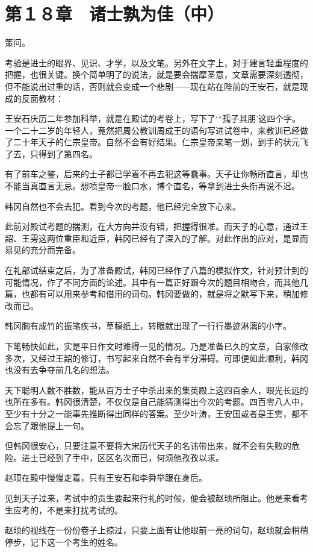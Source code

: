 \section{第１８章　诸士孰为佳（中）}

策问。

考验是进士的眼界、见识、才学，以及文笔。另外在文字上，对于建言轻重程度的把握，也很关键。换个简单明了的说法，就是要会揣摩圣意，文章需要深刻透彻，但不能说出过重的话，否则就会变成一个悲剧——现在站在陛前的王安石，就是现成的反面教材：

王安石庆历二年参加科举，就是在殿试的考卷上，写下了‘“孺子其朋’这四个字。一个二十二岁的年轻人，竟然把周公教训周成王的语句写进试卷中，来教训已经做了二十年天子的仁宗皇帝。自然不会有好结果。仁宗皇帝亲笔一划，到手的状元飞了去，只得到了第四名。

有了前车之鉴，后来的士子都已学着不再去犯这等蠢事。天子让你畅所直言，却也不能当真直言无忌。想喷皇帝一脸口水，博个直名，等拿到进士头衔再说不迟。

韩冈自然也不会去犯。看到今次的考题，他已经完全放下心来。

此前对殿试考题的揣测，在大方向并没有错，把握得很准。而天子的心意，通过王韶、王雱这两位重臣和近臣，韩冈已经有了深入的了解。对此作出的应对，是显而易见的充分而完备。

在礼部试结束之后，为了准备殿试，韩冈已经作了八篇的模拟作文，针对预计到的可能情况，作了不同方面的论述。其中有一篇正好跟今次的题目相吻合，而其他几篇，也都有可以用来参考和借用的词句。韩冈要做的，就是将之默写下来，稍加修改而已。

韩冈胸有成竹的振笔疾书，草稿纸上，转眼就出现了一行行墨迹淋漓的小字。

下笔畅快如此，实是平日作文时难得一见的情况。乃是准备已久的文章，自家修改多次，又经过王韶的修订，书写起来自然不会有半分滞碍。可即便如此顺利，韩冈也没有去争夺前几名的想法。

天下聪明人数不胜数，能从百万士子中杀出来的集英殿上这四百余人，眼光长远的也所在多有。韩冈很清楚，不仅仅是自己能猜测得出今次的考题。四百零八人中，至少有十分之一能事先推断得出同样的答案。至少叶涛，王安国或者是王雱，都不会忘了跟他提上一句。

但韩冈很安心，只要注意不要将大宋历代天子的名讳带出来，就不会有失败的危险。进士已经到了手中，区区名次而已，何须他孜孜以求。

赵顼在殿中慢慢走着，只有王安石和李舜举跟在身后。

见到天子过来，考试中的贡生要起来行礼的时候，便会被赵顼所阻止。他是来看考生应考的，不是来打扰考试的。

赵顼的视线在一份份卷子上掠过，只要上面有让他眼前一亮的词句，赵顼就会稍稍停步，记下这一个考生的姓名。

